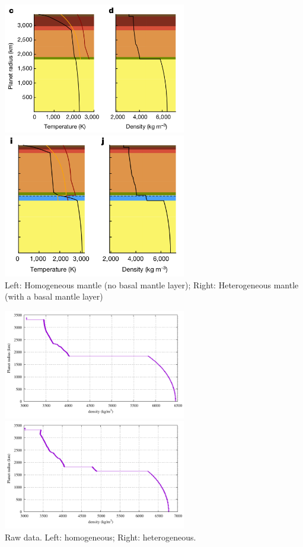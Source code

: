 \begin{itemize}
\begin{center}
\includegraphics[width=8cm]{images/mars/density/sadr23_a}
\includegraphics[width=8cm]{images/mars/density/sadr23_b}\\
{\captionfont 
Left: Homogeneous mantle (no basal mantle layer); 
Right: Heterogeneous mantle (with a basal mantle layer)}
\end{center}

\begin{center}
\includegraphics[width=8cm]{images/mars/density/sadr23_fig1d/rho.pdf}
\includegraphics[width=8cm]{images/mars/density/sadr23_fig1j/rho.pdf}\\
{\captionfont Raw data. Left: homogeneous; Right: heterogeneous.}
\end{center} 


\end{itemize}

